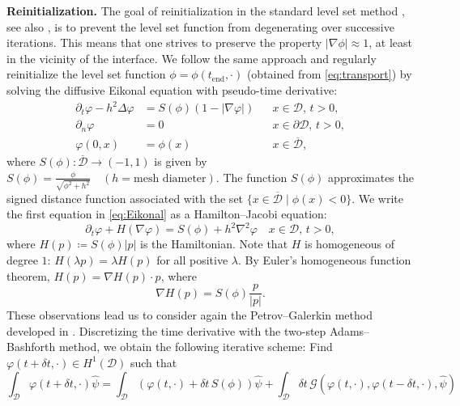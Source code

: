 \documentclass[preprint,9pt]{elsarticle}
\begin{document}
\textbf{Reinitialization.} 
The goal of reinitialization in the standard level set method \cite{MR965860},
see also \cite{MR3843884}, is to prevent the level set function
from degenerating over successive iterations.
This means that one strives to preserve the property $|\nabla\phi|\approx 1$,
at least in the vicinity of the interface.
We follow the same approach and regularly reinitialize the level set function
$\phi = \phi(t_{\text{end}}, \cdot)$ (obtained from \eqref{eq:transport})
by solving the diffusive Eikonal equation with pseudo-time derivative:
\begin{equation}\label{eq:Eikonal}
\begin{aligned}
    \partial_t \varphi - h^2 \Delta \varphi &= S(\phi)(1 - |\nabla \varphi|)
    && x\in \mathcal{D},\, t>0, \\
    \partial_n \varphi &= 0
    && x\in \partial\mathcal{D},\, t>0, \\
	\varphi(0, x) &= \phi(x)
	&& x\in \overline{\mathcal{D}},
\end{aligned}
\end{equation}
where $S(\phi)\colon\overline{\mathcal{D}}\to (-1, 1)$ is given by 
$
	S(\phi) = \frac{\phi}{\sqrt{\phi^2 + h^2}}\quad (h= \text{mesh diameter}).
$
The function $S(\phi)$ approximates the signed distance function associated
with the set $\{x\in\overline{\mathcal{D}} \mid \phi(x)<0\}$.
We write the first equation in \eqref{eq:Eikonal}
as a Hamilton--Jacobi equation:
\begin{equation}\label{eq:HJ}
	\partial_t \varphi + H(\nabla \varphi) =
	S(\phi) + h^2 \nabla^2\varphi \quad x\in \mathcal{D},\, t>0,
\end{equation}
where $H(p) \coloneqq S(\phi) |p|$ is the Hamiltonian.
Note that $H$ is homogeneous of degree $1$: $H(\lambda p) = \lambda H(p)$
for all positive $\lambda$. By Euler's homogeneous function theorem,
$H(p) = \nabla H (p) \cdot p$, where
\begin{equation}\label{eq:grad_H}
	\nabla H (p) = S(\phi)\frac{p}{|p|}.
\end{equation}
These observations lead us to consider again
the Petrov--Galerkin method developed in \cite{MR1640142}. 
Discretizing the time derivative with the two-step Adams--Bashforth method,
we obtain the following iterative scheme:
Find $\varphi(t + \delta t, \cdot) \in H^1(\mathcal{D})$ such that
\begin{equation}\label{eq:weak_HJ}
	\int_{\mathcal{D}}  \varphi(t + \delta t, \cdot) \hat{\psi} =
	\int_{\mathcal{D}} (\varphi(t, \cdot) + {\delta t} \, S(\phi)) \hat{\psi}
	+\int_{\mathcal{D}} {\delta t}\,
	\mathcal{G}(\varphi(t, \cdot), \varphi(t - \delta t, \cdot), \hat{\psi})
\end{equation}
\end{document}

